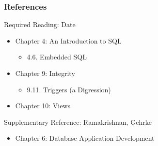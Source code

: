 \documentclass[dvipsnames]{beamer}
\theoremstyle{plain}
\begin{document}
\begin{frame}
  \frametitle{References}

  \begin{block}{Required Reading: Date}
    \begin{itemize}
      \item Chapter 4: An Introduction to SQL
      \begin{itemize}
        \item 4.6. Embedded SQL
      \end{itemize}

      \item Chapter 9: Integrity
      \begin{itemize}
        \item 9.11. \alert{Triggers (a Digression)}
      \end{itemize}

      \item Chapter 10: \alert{Views}
    \end{itemize}
  \end{block}

  \begin{block}{Supplementary Reference: Ramakrishnan, Gehrke}
    \begin{itemize}
      \item Chapter 6: Database Application Development
    \end{itemize}
  \end{block}
\end{frame}
\end{document}
